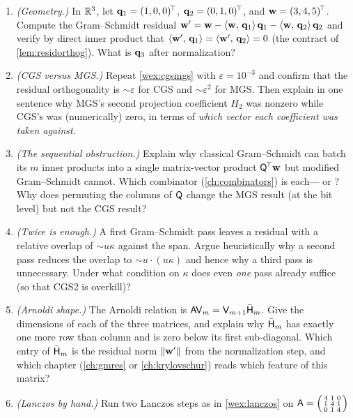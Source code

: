 \exercisessection
\begin{enumerate}[nosep]
  \item \emph{(Geometry.)} In $\mathbb{R}^3$, let $\mathbf{q}_1 = (1,0,0)^{\!\top}$,
  $\mathbf{q}_2 = (0,1,0)^{\!\top}$, and $\mathbf{w} = (3, 4, 5)^{\!\top}$. Compute the
  Gram--Schmidt residual $\mathbf{w}' = \mathbf{w} - \left\langle \mathbf{w},\, \mathbf{q}_1\right\rangle\mathbf{q}_1 -
  \left\langle \mathbf{w},\, \mathbf{q}_2\right\rangle\mathbf{q}_2$ and verify by direct inner product that
  $\left\langle \mathbf{w}',\, \mathbf{q}_1\right\rangle = \left\langle \mathbf{w}',\, \mathbf{q}_2\right\rangle = 0$ (the contract of
  \cref{lem:residorthog}). What is $\mathbf{q}_3$ after normalization?
  \item \emph{(CGS versus MGS.)} Repeat \cref{wex:cgsmgs} with $\varepsilon = 10^{-3}$
  and confirm that the residual orthogonality is $\sim\varepsilon$ for CGS and
  $\sim\varepsilon^2$ for MGS. Then explain in one sentence why MGS's second
  projection coefficient $H_2$ was nonzero while CGS's was (numerically) zero, in
  terms of \emph{which vector each coefficient was taken against}.
  \item \emph{(The sequential obstruction.)} Explain why classical Gram--Schmidt can
  batch its $m$ inner products into a single matrix-vector product
  $\mathsf{Q}^{\!\top}\mathbf{w}$ but modified Gram--Schmidt cannot. Which combinator
  (\cref{ch:combinators}) is each--- or ? Why does permuting the
  columns of $\mathsf{Q}$ change the MGS result (at the bit level) but not the CGS result?
  \item \emph{(Twice is enough.)} A first Gram--Schmidt pass leaves a residual with a
  relative overlap of $\sim u\kappa$ against the span. Argue heuristically why a second
  pass reduces the overlap to $\sim u\cdot(u\kappa)$ and hence why a third pass is
  unnecessary. Under what condition on $\kappa$ does even \emph{one} pass already
  suffice (so that CGS2 is overkill)?
  \item \emph{(Arnoldi shape.)} The Arnoldi relation is
  $\mathsf{A}\mathsf{V}_m = \mathsf{V}_{m+1}\bar{\mathsf{H}}_m$. Give the dimensions of each of the
  three matrices, and explain why $\bar{\mathsf{H}}_m$ has exactly one more row than
  column and is zero below its first sub-diagonal. Which entry of $\bar{\mathsf{H}}_m$ is
  the residual norm $\lVert\mathbf{w}'\rVert$ from the normalization step, and which chapter
  (\cref{ch:gmres} or \cref{ch:krylovschur}) reads which feature of this matrix?
  \item \emph{(Lanczos by hand.)} Run two Lanczos steps as in \cref{wex:lanczos} on
  $\mathsf{A} = \begin{psmallmatrix} 4 & 1 & 0 \\ 1 & 4 & 1 \\ 0 & 1 & 4 \end{psmallmatrix}$

\end{enumerate}
